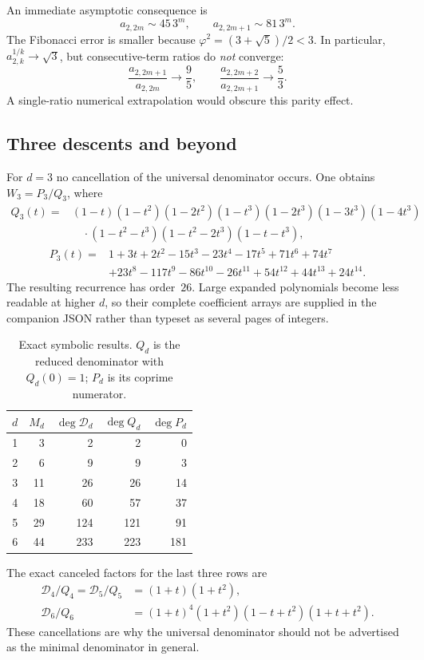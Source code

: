 \documentclass[11pt,letterpaper]{article}
\numberwithin{equation}{section}
\theoremstyle{definition}
\theoremstyle{remark}
\begin{document}
An immediate asymptotic consequence is
\begin{equation}\label{eq:W2asymptotic}
 a_{2,2m}\sim45\,3^m,\qquad a_{2,2m+1}\sim81\,3^m.
\end{equation}
The Fibonacci error is smaller because $\varphi^2=(3+\sqrt5)/2<3$.
In particular, $a_{2,k}^{1/k}\to\sqrt3$, but consecutive-term ratios do
\emph{not} converge:
\[
 \frac{a_{2,2m+1}}{a_{2,2m}}\longrightarrow\frac95,
 \qquad
 \frac{a_{2,2m+2}}{a_{2,2m+1}}\longrightarrow\frac53.
\]
A single-ratio numerical extrapolation would obscure this parity effect.

\subsection{Three descents and beyond}
For $d=3$ no cancellation of the universal denominator occurs. One obtains
$W_3=P_3/Q_3$, where
\begin{equation}\label{eq:Q3}
\begin{split}
 Q_3(t)={}&(1-t)(1-t^2)(1-2t^2)
 (1-t^3)(1-2t^3)(1-3t^3)(1-4t^3)\\
 &\quad\cdot(1-t^2-t^3)(1-t^2-2t^3)(1-t-t^3),
\end{split}
\end{equation}
\begin{equation}\label{eq:P3}
\begin{split}
 P_3(t)={}&1+3t+2t^2-15t^3-23t^4-17t^5+71t^6+74t^7\\
 &+23t^8-117t^9-86t^{10}-26t^{11}+54t^{12}+44t^{13}+24t^{14}.
\end{split}
\end{equation}
The resulting recurrence has order~$26$.
Large expanded polynomials become less readable at higher $d$, so their
complete coefficient arrays are supplied in the companion JSON rather
than typeset as several pages of integers.

\begin{table}[htbp]
\centering
\caption{Exact symbolic results. $Q_d$ is the reduced denominator with
$Q_d(0)=1$; $P_d$ is its coprime numerator.}
\label{tab:degrees}
\begin{tabular}{rrrrr}
\toprule
$d$ & $M_d$ & $\deg\mathcal D_d$ & $\deg Q_d$ & $\deg P_d$\\
\midrule
1 & 3  & 2   & 2   & 0\\
2 & 6  & 9   & 9   & 3\\
3 & 11 & 26  & 26  & 14\\
4 & 18 & 60  & 57  & 37\\
5 & 29 & 124 & 121 & 91\\
6 & 44 & 233 & 223 & 181\\
\bottomrule
\end{tabular}
\end{table}
The exact canceled factors for the last three rows are
\begin{align*}
 \mathcal D_4/Q_4=\mathcal D_5/Q_5&=(1+t)(1+t^2),\\
 \mathcal D_6/Q_6&=(1+t)^4(1+t^2)(1-t+t^2)(1+t+t^2).
\end{align*}
These cancellations are why the universal denominator should not be
advertised as the minimal denominator in general.
\end{document}
